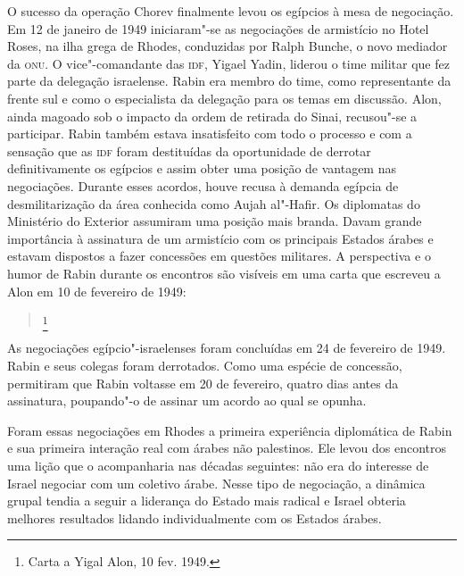 O sucesso da operação Chorev finalmente levou os egípcios à mesa de
negociação. Em 12 de janeiro de 1949 iniciaram"-se as negociações de
armistício no Hotel Roses, na ilha grega de Rhodes, conduzidas por Ralph
Bunche, o novo mediador da \textsc{onu}. O vice"-comandante das \textsc{idf}, Yigael Yadin,
liderou o time militar que fez parte da delegação israelense. Rabin era
membro do time, como representante da frente sul e como o especialista
da delegação para os temas em discussão. Alon, ainda magoado sob o
impacto da ordem de retirada do Sinai, recusou"-se a participar. Rabin
também estava insatisfeito com todo o processo e com a sensação que as
\textsc{idf} foram destituídas da oportunidade de derrotar definitivamente os
egípcios e assim obter uma posição de vantagem nas negociações. Durante
esses acordos, houve recusa à demanda egípcia de desmilitarização da área
conhecida como Aujah al"-Hafir. Os diplomatas do Ministério do Exterior
assumiram uma posição mais branda. Davam grande importância à assinatura
de um armistício com os principais Estados árabes e estavam dispostos a
fazer concessões em questões militares. A perspectiva e o humor de Rabin
durante os encontros são visíveis em uma carta que escreveu a Alon em
10 de fevereiro de 1949:

\begin{quote}
\footnote{Carta a Yigal Alon, 10 fev. 1949.}
\end{quote}

As negociações egípcio"-israelenses foram concluídas em 24 de fevereiro
de 1949. Rabin e seus colegas foram derrotados. Como uma espécie de
concessão, permitiram que Rabin voltasse em 20 de fevereiro, quatro dias
antes da assinatura, poupando"-o de assinar um acordo ao qual se opunha.

Foram essas negociações em Rhodes a primeira experiência diplomática de
Rabin e sua primeira interação real com árabes não palestinos. Ele levou
dos encontros uma lição que o acompanharia nas décadas seguintes: não
era do interesse de Israel negociar com um coletivo árabe. Nesse tipo de
negociação, a dinâmica grupal tendia a seguir a liderança do Estado mais
radical e Israel obteria melhores resultados lidando individualmente com
os Estados árabes.

